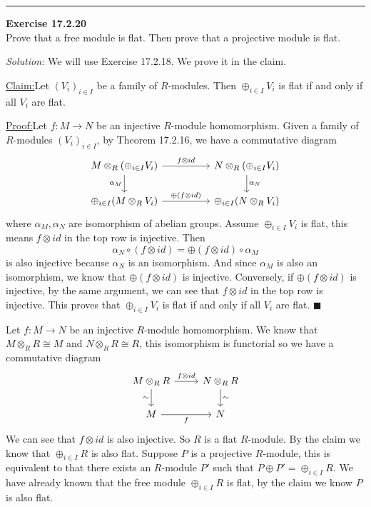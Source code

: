 \documentclass[a4paper, 12pt]{article}
\newenvironment{problem}[2][Exercise]
    { \begin{mdframed}[backgroundcolor=gray!20] \textbf{#1 #2} \\}
    {  \end{mdframed}}
\newenvironment{solution}
    {\textit{Solution:}}
    {}
\newenvironment{claim}[1]{\par\noindent\underline{Claim:}\space#1}{}
\newenvironment{claimproof}[1]{\par\noindent\underline{Proof:}\space#1}{\hfill $\blacksquare$}
\begin{document}
\noindent\rule{7in}{2.8pt}
\begin{problem}{17.2.20}
Prove that a free module is flat. Then prove that a projective module is flat. 
\end{problem}
\begin{solution}
We will use Exercise 17.2.18. We prove it in the claim.
\begin{claim}
Let \((V_i)_{i\in I}\) be a family of \(R\)-modules. Then \(\oplus_{i\in I}V_i\) is flat if and only if all \(V_i\) are flat. 
\end{claim}
\begin{claimproof}
Let \(f:M\rightarrow N\) be an injective \(R\)-module homomorphism. Given a family of \(R\)-modules \((V_i)_{i\in I}\), by Theorem 17.2.16, we have a commutative diagram 
\[\begin{tikzcd}
	{M\otimes_R(\oplus_{i\in I}V_i)} && {N\otimes_R(\oplus_{i\in I}V_i)} \\
	{\oplus_{i\in I}(M\otimes_RV_i)} && {\oplus_{i\in I}(N\otimes_RV_i)}
	\arrow["{f\otimes id}", from=1-1, to=1-3]
	\arrow["{\alpha_M}"', from=1-1, to=2-1]
	\arrow["{\alpha_N}", from=1-3, to=2-3]
	\arrow["{\oplus(f\otimes id)}", from=2-1, to=2-3]
\end{tikzcd}\]
where \(\alpha_M,\alpha_N\) are isomorphism of abelian groups. Assume \(\oplus_{i\in I}V_i\) is flat, this means \(f\otimes id\) in the top row is injective. Then 
\[\alpha_N\circ (f\otimes id)=\oplus(f\otimes id)\circ \alpha_M\]
is also injective because \(\alpha_N\) is an isomorphism. And since \(\alpha_M\) is also an isomorphism, we know that \(\oplus(f\otimes id)\) is injective. Conversely, if \(\oplus(f\otimes id)\) is injective, by the same 
argument, we can see that \(f\otimes id\) in the top row is injective. This proves that \(\oplus_{i\in I}V_i\) is flat if and only if all \(V_i\) are flat.
\end{claimproof}

Let \(f:M\rightarrow N\) be an injective \(R\)-module homomorphism. We know that \(M\otimes_R R\cong M\) and \(N\otimes_R R\cong R\), this isomorphism is functorial so we have a commutative diagram 
\[\begin{tikzcd}
	{M\otimes_R R} & {N\otimes_R R} \\
	M & N
	\arrow["{f\otimes id }", from=1-1, to=1-2]
	\arrow["\sim"', from=1-1, to=2-1]
	\arrow["\sim", from=1-2, to=2-2]
	\arrow["f"', from=2-1, to=2-2]
\end{tikzcd}\]
We can see that \(f\otimes id\) is also injective. So \(R\) is a flat \(R\)-module. By the claim we know that \(\oplus_{i\in I}R\) is also flat. Suppose \(P\) is a projective \(R\)-module, this is equivalent to that there exists 
an \(R\)-module \(P'\) such that \(P\oplus P'=\oplus_{i\in I}R\). We have already known that the free module \(\oplus_{i\in I}R\) is flat, by the claim we know \(P\) is also flat. 

\end{solution}
\end{document}
